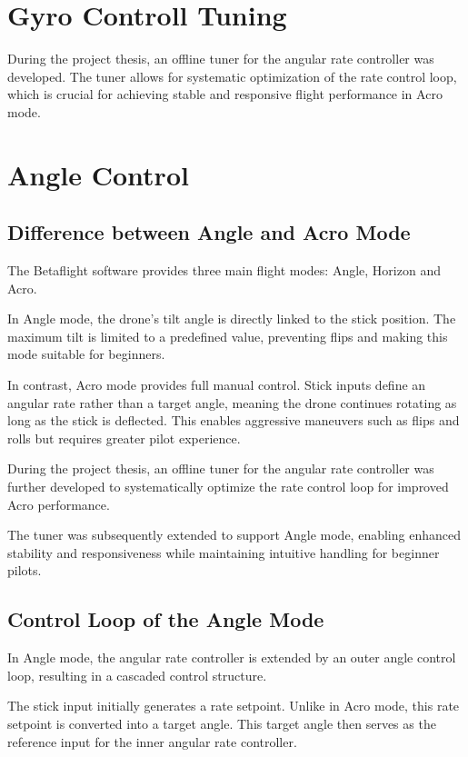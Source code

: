 \documentclass[a4paper,11pt,bibliography=totoc,listof=totoc]{scrreprt}
\begin{document}
\clearpage

\section{Gyro Controll Tuning}

During the project thesis, an offline tuner for the angular rate controller was developed. 
The tuner allows for systematic optimization of the rate control loop, which is crucial for 
achieving stable and responsive flight performance in Acro mode.


\section{Angle Control}

\subsection{Difference between Angle and Acro Mode}
The Betaflight software provides three main flight modes: Angle, Horizon and Acro.

In Angle mode, the drone’s tilt angle is directly linked to the stick position. The maximum tilt is limited to a predefined value, preventing flips and making this mode suitable for beginners.

In contrast, Acro mode provides full manual control. Stick inputs define an angular rate rather than a target angle, meaning the drone continues rotating as long as the stick is deflected. This enables aggressive maneuvers such as flips and rolls but requires greater pilot experience.

During the project thesis, an offline tuner for the angular rate controller was further developed to systematically optimize the rate control loop for improved Acro performance.

The tuner was subsequently extended to support Angle mode, enabling enhanced stability and responsiveness while maintaining intuitive handling for beginner pilots.

\subsection{Control Loop of the Angle Mode}

In Angle mode, the angular rate controller is extended by an outer angle control loop, resulting in a cascaded control structure.

The stick input initially generates a rate setpoint. Unlike in Acro mode, this rate setpoint is converted into a target angle. This target angle then serves as the reference input for the inner angular rate controller.
\end{document}
